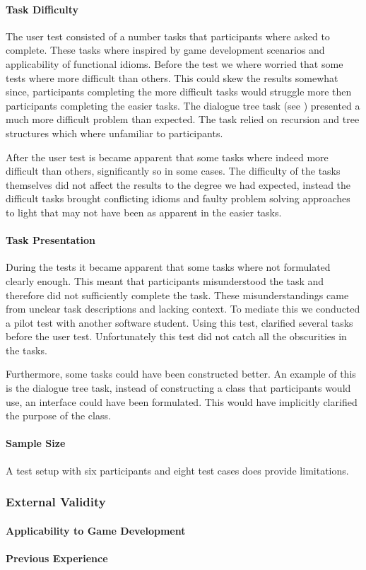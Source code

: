 \paragraph{Task Difficulty}
The user test consisted of a number tasks that participants where asked to complete. These tasks where inspired by game development scenarios and applicability of functional idioms. Before the test we where worried that some tests where more difficult than others. This could skew the results somewhat since, participants completing the more difficult tasks would struggle more then participants completing the easier tasks. The dialogue tree task (see ) presented a much more difficult problem than expected. The task relied on recursion and tree structures which where unfamiliar to participants.

After the user test is became apparent that some tasks where indeed more difficult than others, significantly so in some cases. The difficulty of the tasks themselves did not affect the results to the degree we had expected, instead the difficult tasks brought conflicting idioms and faulty problem solving approaches to light that may not have been as apparent in the easier tasks.

\paragraph{Task Presentation}
During the tests it became apparent that some tasks where not formulated clearly enough. This meant that participants misunderstood the task and therefore did not sufficiently complete the task. These misunderstandings came from unclear task descriptions and lacking context. To mediate this we conducted a pilot test with another software student. Using this test, clarified several tasks before the user test. Unfortunately this test did not catch all the obscurities in the tasks.

Furthermore, some tasks could have been constructed better. An example of this is the dialogue tree task, instead of constructing a class that participants would use, an interface could have been formulated. This would have implicitly clarified the purpose of the class.

\paragraph{Sample Size}
A test setup with six participants and eight test cases does provide limitations.

\subsubsection{External Validity}
\metasheep

\paragraph{Applicability to Game Development}

\paragraph{Previous Experience}

